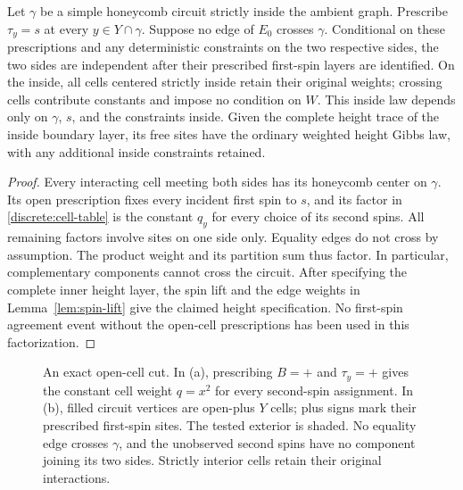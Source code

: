 \begin{samepage}
\begin{lemma}\label{lem:cell-cut}
Let $\gamma$ be a simple honeycomb circuit strictly inside the ambient graph.
Prescribe $\tau_y=s$ at every $y\in Y\cap\gamma$. Suppose no edge of $E_0$
crosses $\gamma$. Conditional on these prescriptions and any deterministic
constraints on the two respective sides, the two sides are independent
after their prescribed first-spin layers are identified. On the inside,
all cells centered strictly inside retain their original weights; crossing
cells contribute constants and impose no condition on $W$. This inside law
depends only on $\gamma$, $s$, and the constraints inside. Given the complete
height trace of the inside boundary layer, its free sites have the ordinary
weighted height Gibbs law, with any additional inside constraints retained.
\end{lemma}
\end{samepage}
\begin{proof}
Every interacting cell meeting both sides has its honeycomb center on
$\gamma$. Its open prescription fixes every incident first spin to $s$,
and its factor in \eqref{discrete:cell-table} is the constant $q_y$ for
every choice of its second spins. All remaining factors involve sites on
one side only. Equality edges do not cross by assumption. The product
weight and its partition sum thus factor. In particular, complementary
components cannot cross the circuit. After specifying the complete inner
height layer, the spin lift and the edge weights in
Lemma~\ref{lem:spin-lift} give the claimed height specification. No
first-spin agreement event without the open-cell prescriptions has been
used in this factorization.
\end{proof}

\begin{figure}[tbp]
 \centering
 
 \caption{An exact open-cell cut. In (a), prescribing $B=+$ and
 $\tau_y=+$ gives the constant cell weight $q=x^2$ for every second-spin
 assignment. In (b), filled circuit vertices are open-plus $Y$ cells;
 plus signs mark their prescribed first-spin sites. The tested exterior
 is shaded. No equality edge crosses $\gamma$, and the unobserved second
 spins have no component joining its two sides. Strictly interior cells
 retain their original interactions.}
 \label{discrete:fig-cut}
\end{figure}

